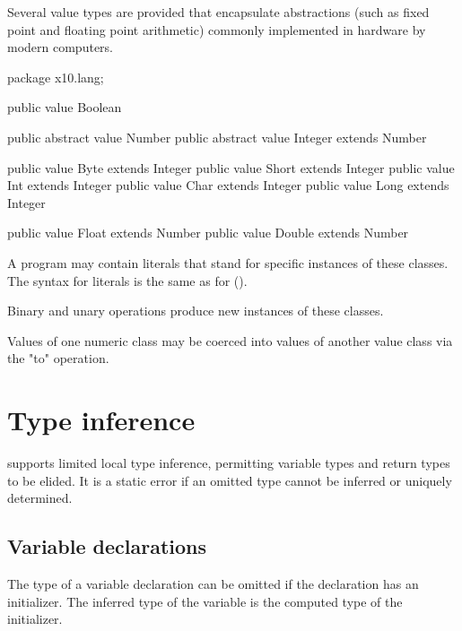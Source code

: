 Several value types are provided that encapsulate
abstractions (such as fixed point and floating point arithmetic)
commonly implemented in hardware by modern computers.

\begin{xten}
package x10.lang;

public value Boolean { }

public abstract value Number { }
public abstract value Integer extends Number { }

public value Byte extends Integer  { }
public value Short extends Integer { }
public value Int extends Integer   { }
public value Char extends Integer  { }
public value Long extends Integer  { }

public value Float extends Number  { }
public value Double extends Number { }
\end{xten}

A program may contain literals
that stand for specific instances of these classes. The syntax
for literals is the same as for \java{} ().

Binary and unary operations produce new instances of these
classes.

Values of one numeric class may be coerced into values of
another value class via the \xcd"to" operation.





\section{Type inference}
\label{TypeInference}

\XtenCurrVer{} supports limited local type inference, permitting
variable types and return types to be elided.
It is a static error if an omitted type cannot be inferred or
uniquely determined.

\subsection{Variable declarations}

The type of a variable declaration can be omitted if the
declaration has an initializer.  The inferred type of the
variable is the computed type of the initializer.

